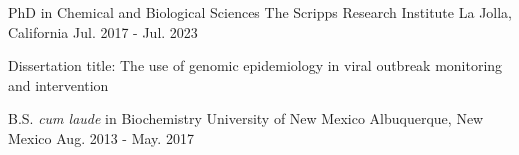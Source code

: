 
\begin{cventries}

  \cventry
    {PhD in Chemical and Biological Sciences} %
    {The Scripps Research Institute} %
    {La Jolla, California} %
    {Jul. 2017 - Jul. 2023} %
    {
      \begin{cvitems} %
        \item {Dissertation title: The use of genomic epidemiology in viral outbreak monitoring and intervention}
      \end{cvitems}
    }

  \cventry
    {B.S. \textit{cum laude} in Biochemistry} %
    {University of New Mexico} %
    {Albuquerque, New Mexico} %
    {Aug. 2013 - May. 2017} %
    {}

\end{cventries}
